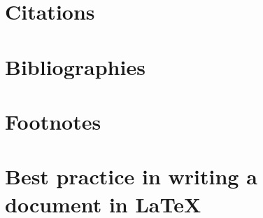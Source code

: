 \section{Citations}\label{Sec:Citations}


\section{Bibliographies}\label{Sec:Bibliographies}


\section{Footnotes}


\section{Best practice in writing a document in LaTeX}
